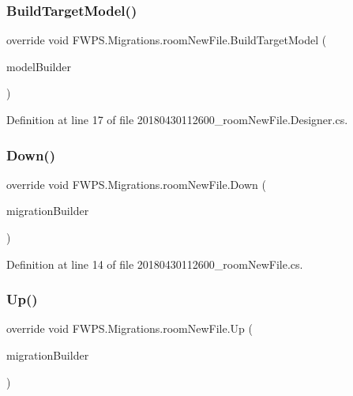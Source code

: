 \subsubsection{\texorpdfstring{Build\+Target\+Model()}{BuildTargetModel()}}
{\footnotesize\ttfamily override void F\+W\+P\+S.\+Migrations.\+room\+New\+File.\+Build\+Target\+Model (\begin{DoxyParamCaption}\item[{Model\+Builder}]{model\+Builder }\end{DoxyParamCaption})\hspace{0.3cm}{\ttfamily [protected]}}



Definition at line 17 of file 20180430112600\+\_\+room\+New\+File.\+Designer.\+cs.

\mbox{\label{class_f_w_p_s_1_1_migrations_1_1room_new_file_a524450e12c94c4d5377310d043c6c9b8}} 
\subsubsection{\texorpdfstring{Down()}{Down()}}
{\footnotesize\ttfamily override void F\+W\+P\+S.\+Migrations.\+room\+New\+File.\+Down (\begin{DoxyParamCaption}\item[{Migration\+Builder}]{migration\+Builder }\end{DoxyParamCaption})\hspace{0.3cm}{\ttfamily [protected]}}



Definition at line 14 of file 20180430112600\+\_\+room\+New\+File.\+cs.

\mbox{\label{class_f_w_p_s_1_1_migrations_1_1room_new_file_a9f4f98fa3b3035a1cd6a6aeb844f115f}} 
\subsubsection{\texorpdfstring{Up()}{Up()}}
{\footnotesize\ttfamily override void F\+W\+P\+S.\+Migrations.\+room\+New\+File.\+Up (\begin{DoxyParamCaption}\item[{Migration\+Builder}]{migration\+Builder }\end{DoxyParamCaption})\hspace{0.3cm}{\ttfamily [protected]}}



